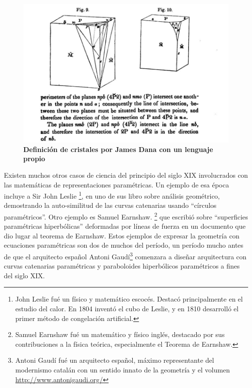 \begin{figure}[h]
\includegraphics[width=12cm]{Img/GEO/geo-dana.jpg}
\centering
\caption{\textbf{\footnotesize{Definición de cristales por James Dana con un lenguaje propio}}}
\end{figure}


Existen muchos otros casos de ciencia del principio del siglo XIX involucrados con las matemáticas de representaciones paramétricas. Un ejemplo de esa época incluye a Sir John Leslie \footnote{John Leslie fué un físico y matemático escocés. Destacó principalmente en el estudio del calor. En 1804 inventó el cubo de Leslie, y en 1810 desarrolló el primer método de congelación artificial.}, en uno de sus libro sobre análisis geométrico, demostrando la auto-similitud de las curvas catenarias usando ``círculos paramétricos''. Otro ejemplo es Samuel Earnshaw. \footnote{Samuel Earnshaw fué un matemático y físico inglés, destacado por sus contribuciones a la física teórica, especialmente el Teorema de Earnshaw.} que escribió sobre ``superficies paramétricas hiperbólicas'' deformadas por líneas de fuerza en un documento que dio lugar al teorema de Earnshaw. Estos ejemplos de expresar la geometría con ecuaciones paramétricas son dos de muchos del período, un período mucho antes de que el arquitecto español Antoni Gaudí\footnote{Antoni Gaudí fué un arquitecto español, máximo representante del modernismo catalán con un sentido innato de la geometría y el volumen \url{http://www.antonigaudi.org/} } comenzara a diseñar arquitectura con curvas catenarias paramétricas y paraboloides hiperbólicos paramétricos a fines del siglo XIX.

